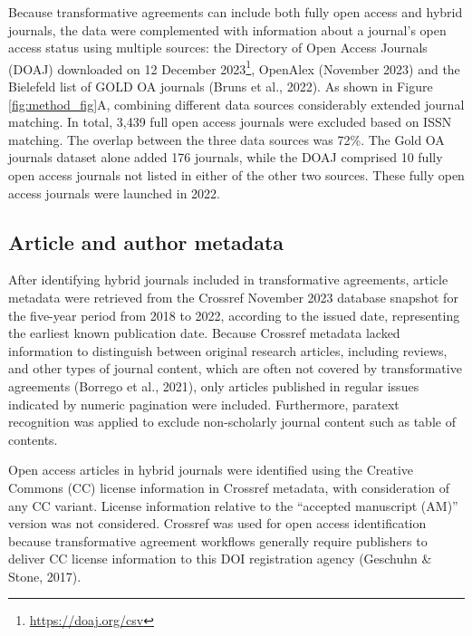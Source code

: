 \documentclass[a4paper,man,floatsintext,longtable,noextraspace,12pt]{apa6}
\begin{document}
Because transformative agreements can include both fully open access and
hybrid journals, the data were complemented with information about a
journal's open access status using multiple sources: the Directory of
Open Access Journals (DOAJ) downloaded on 12 December 2023\footnote{\url{https://doaj.org/csv}},
OpenAlex (November 2023) and the Bielefeld list of GOLD OA journals
(Bruns et al., 2022). As shown in Figure \ref{fig:method_fig}A,
combining different data sources considerably extended journal matching.
In total, 3,439 full open access journals were excluded based on ISSN
matching. The overlap between the three data sources was 72\%. The Gold
OA journals dataset alone added 176 journals, while the DOAJ comprised
10 fully open access journals not listed in either of the other two
sources. These fully open access journals were launched in 2022.

\subsection{Article and author
metadata}\label{article-and-author-metadata}

After identifying hybrid journals included in transformative agreements,
article metadata were retrieved from the Crossref November 2023 database
snapshot for the five-year period from 2018 to 2022, according to the
issued date, representing the earliest known publication date. Because
Crossref metadata lacked information to distinguish between original
research articles, including reviews, and other types of journal
content, which are often not covered by transformative agreements
(Borrego et al., 2021), only articles published in regular issues
indicated by numeric pagination were included. Furthermore, paratext
recognition was applied to exclude non-scholarly journal content such as
table of contents.

Open access articles in hybrid journals were identified using the
Creative Commons (CC) license information in Crossref metadata, with
consideration of any CC variant. License information relative to the
``accepted manuscript (AM)'' version was not considered. Crossref was
used for open access identification because transformative agreement
workflows generally require publishers to deliver CC license information
to this DOI registration agency (Geschuhn \& Stone, 2017).
\end{document}

